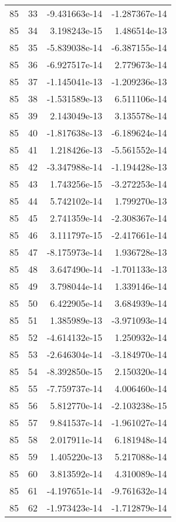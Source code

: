 \begin{tabular}{rrrr}
  85 &   33 & -9.431663e-14 & -1.287367e-14 \\
  85 &   34 &  3.198243e-15 &  1.486514e-13 \\
  85 &   35 & -5.839038e-14 & -6.387155e-14 \\
  85 &   36 & -6.927517e-14 &  2.779673e-14 \\
  85 &   37 & -1.145041e-13 & -1.209236e-13 \\
  85 &   38 & -1.531589e-13 &  6.511106e-14 \\
  85 &   39 &  2.143049e-13 &  3.135578e-14 \\
  85 &   40 & -1.817638e-13 & -6.189624e-14 \\
  85 &   41 &  1.218426e-13 & -5.561552e-14 \\
  85 &   42 & -3.347988e-14 & -1.194428e-13 \\
  85 &   43 &  1.743256e-15 & -3.272253e-14 \\
  85 &   44 &  5.742102e-14 &  1.799270e-13 \\
  85 &   45 &  2.741359e-14 & -2.308367e-14 \\
  85 &   46 &  3.111797e-15 & -2.417661e-14 \\
  85 &   47 & -8.175973e-14 &  1.936728e-13 \\
  85 &   48 &  3.647490e-14 & -1.701133e-13 \\
  85 &   49 &  3.798044e-14 &  1.339146e-14 \\
  85 &   50 &  6.422905e-14 &  3.684939e-14 \\
  85 &   51 &  1.385989e-13 & -3.971093e-14 \\
  85 &   52 & -4.614132e-15 &  1.250932e-14 \\
  85 &   53 & -2.646304e-14 & -3.184970e-14 \\
  85 &   54 & -8.392850e-15 &  2.150320e-14 \\
  85 &   55 & -7.759737e-14 &  4.006460e-14 \\
  85 &   56 &  5.812770e-14 & -2.103238e-15 \\
  85 &   57 &  9.841537e-14 & -1.961027e-14 \\
  85 &   58 &  2.017911e-14 &  6.181948e-14 \\
  85 &   59 &  1.405220e-13 &  5.217088e-14 \\
  85 &   60 &  3.813592e-14 &  4.310089e-14 \\
  85 &   61 & -4.197651e-14 & -9.761632e-14 \\
  85 &   62 & -1.973423e-14 & -1.712879e-14 \\

\end{tabular}
